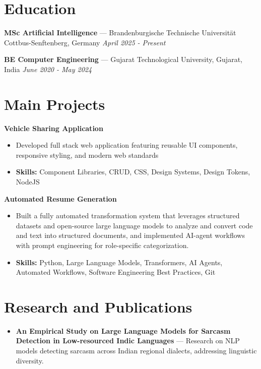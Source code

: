 \documentclass[a4paper,10pt]{article}
\begin{document}
\section*{Education}
\textbf{MSc Artificial Intelligence} — Brandenburgische Technische Universität Cottbus-Senftenberg, Germany \hfill \textit{April 2025 - Present}\par
\vspace{1.5pt}
\textbf{BE Computer Engineering} — Gujarat Technological University, Gujarat, India \hfill \textit{June 2020 - May 2024}\par

\section*{Main Projects}
\textbf{Vehicle Sharing Application}\par
\vspace{1pt}
\begin{itemize}
  \item Developed full stack web application featuring reusable UI components, responsive styling, and modern web standards
  \item \textbf{Skills:} Component Libraries, CRUD, CSS, Design Systems, Design Tokens, NodeJS
\end{itemize}
\vspace{3pt}
\textbf{Automated Resume Generation}\par
\vspace{1pt}
\begin{itemize}
  \item Built a fully automated transformation system that leverages structured datasets and open-source large language models to analyze and convert code and text into structured documents, and implemented AI-agent workflows with prompt engineering for role-specific categorization.
  \item \textbf{Skills:} Python, Large Language Models, Transformers, AI Agents, Automated Workflows, Software Engineering Best Practices, Git
\end{itemize}

\section*{Research and Publications}
\begin{itemize}
\item \textbf{An Empirical Study on Large Language Models for Sarcasm Detection in Low-resourced Indic Languages} — Research on NLP models detecting sarcasm across Indian regional dialects, addressing linguistic diversity.
\end{itemize}
\end{document}
